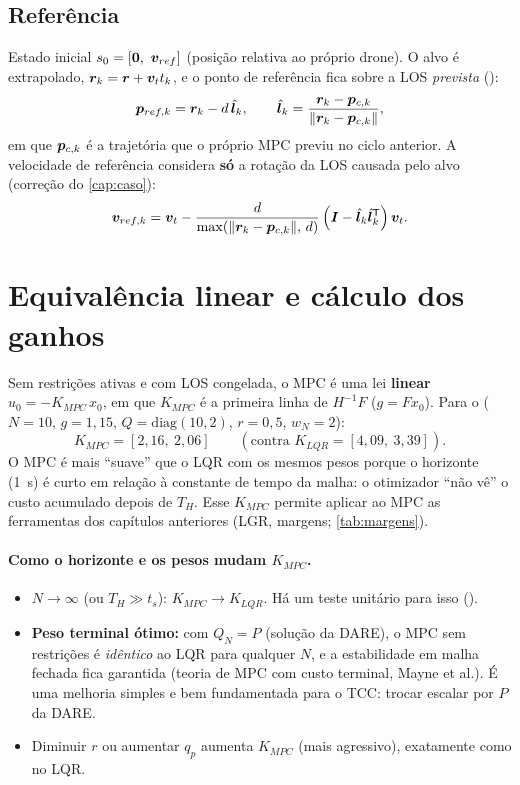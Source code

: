 \subsection{Referência}
Estado inicial $s_0=[\bm{0},\ \bm{v}_{ref}]$ (posição relativa ao próprio drone). O
alvo é extrapolado, $\bm{r}_k=\bm{r}+\bm{v}_t t_k$, e o ponto de referência fica sobre a LOS
\emph{prevista} ():
\begin{equation}
  \bm{p}_{ref,k} = \bm{r}_k - d\,\hat{\bm{l}}_k,\qquad
  \hat{\bm{l}}_k = \frac{\bm{r}_k - \bm{p}_{c,k}}{\lVert\bm{r}_k-\bm{p}_{c,k}\rVert},
\end{equation}
em que $\bm{p}_{c,k}$ é a trajetória que o próprio MPC previu no ciclo anterior. A
velocidade de referência considera \textbf{só} a rotação da LOS causada pelo alvo
(correção do \cref{cap:caso}):
\begin{equation}
  \bm{v}_{ref,k} = \bm{v}_t - \frac{d}{\max(\lVert\bm{r}_k-\bm{p}_{c,k}\rVert,\,d)}
  \left(\bm{I}-\hat{\bm{l}}_k\hat{\bm{l}}_k^{\mathsf{T}}\right)\bm{v}_t .
\end{equation}

\section{Equivalência linear e cálculo dos ganhos}
Sem restrições ativas e com LOS congelada, o MPC é uma lei \textbf{linear}
$u_0 = -K_{MPC}\,x_0$, em que $K_{MPC}$ é a primeira linha de $H^{-1}F$ ($g=Fx_0$). Para o
 ($N=10$, $g=1{,}15$, $Q=\mathrm{diag}(10,2)$, $r=0{,}5$, $w_N=2$):
\begin{equation}
  K_{MPC} = [2{,}16,\ 2{,}06]\qquad(\text{contra } K_{LQR}=[4{,}09,\ 3{,}39]).
\end{equation}
O MPC é mais ``suave'' que o LQR com os mesmos pesos porque o horizonte (\SI{1}{s}) é
curto em relação à constante de tempo da malha: o otimizador ``não vê'' o custo
acumulado depois de $T_H$. Esse $K_{MPC}$ permite aplicar ao MPC as ferramentas dos
capítulos anteriores (LGR, margens; \cref{tab:margens}).

\paragraph{Como o horizonte e os pesos mudam $K_{MPC}$.}
\begin{itemize}
  \item $N\to\infty$ (ou $T_H\gg t_s$): $K_{MPC}\to K_{LQR}$. Há um teste unitário para
        isso ().
  \item \textbf{Peso terminal ótimo:} com $Q_N=P$ (solução da DARE), o MPC sem
        restrições é \emph{idêntico} ao LQR para qualquer $N$, e a estabilidade em malha
        fechada fica garantida (teoria de MPC com custo terminal, Mayne et al.). É uma
        melhoria simples e bem fundamentada para o TCC: trocar
         escalar por $P$ da DARE.
  \item Diminuir $r$ ou aumentar $q_p$ aumenta $K_{MPC}$ (mais agressivo), exatamente
        como no LQR.
\end{itemize}

